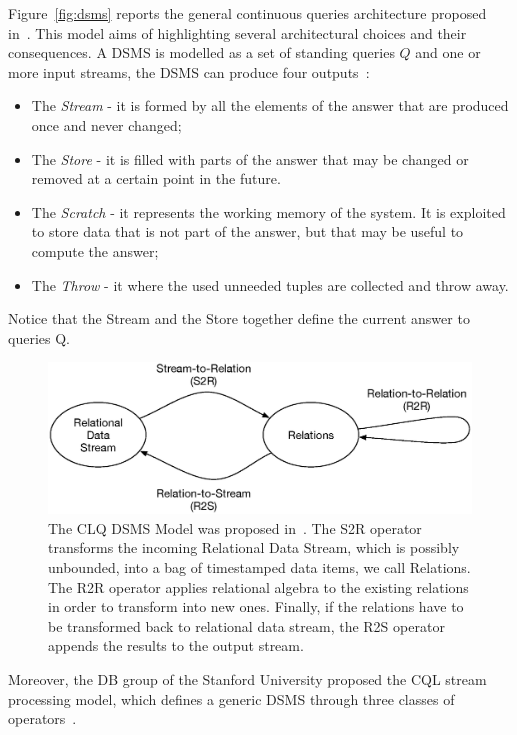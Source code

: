 Figure~\ref{fig:dsms} reports the general continuous queries architecture proposed in~\cite{Babu:2001:CQO:603867.603884}. This model aims of highlighting several architectural choices and their consequences. A DSMS is modelled as a set of standing queries $Q$ and one or more input streams, the DSMS can produce four outputs~\cite{Cugola:2012:PFI:2187671.2187677}:

\begin{itemize}
\item The \textit{Stream} - it is formed by all the elements of the answer that are produced once and never changed;
\item The \textit{Store} - it is filled with parts of the answer that may be changed or removed at a certain point in the future. 
\item The \textit{Scratch} - it represents the working memory of the system. It is exploited to store data that is not part of the answer, but that may be useful to compute the answer;
\item The \textit{Throw} - it where the used unneeded tuples are collected and throw away.
\end{itemize}

Notice that the Stream and the Store together define the current answer to queries Q.


\begin{figure}[tbh]
  \centering
	\includegraphics[width=\linewidth]{images/cql-model}
	\caption[CLQ DSMS Model]{The CLQ DSMS Model was proposed in~\cite{Arasu2006}. The S2R operator transforms the incoming Relational Data Stream, which is possibly unbounded, into a bag of timestamped data items, we call Relations. The R2R operator applies relational algebra to the existing relations in order to transform into new ones. Finally, if the relations have to be transformed back to relational data stream, the R2S operator appends the results to the output stream.} 
  	\label{fig:cql}
\end{figure}

Moreover, the DB group of the Stanford University proposed the CQL stream processing model, which defines a generic DSMS through three classes of operators~\cite{Arasu2006}.


